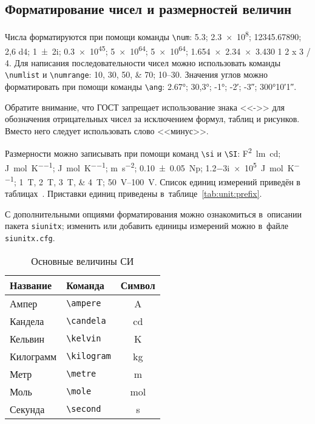 \subsection{Форматирование чисел и размерностей величин}\label{sec:units}

Числа форматируются при помощи команды \verb|\num|:
\num{5,3};
\num{2,3e8};
\num{12345,67890};
\num{2,6 d4};
\num{1+-2i};
\num{.3e45};
\num[exponent-base=2]{5 e64};
\num[exponent-base=2,exponent-to-prefix]{5 e64};
\num{1.654 x 2.34 x 3.430}
\num{1 2 x 3 / 4}.
Для написания последовательности чисел можно использовать команды \verb|\numlist| и \verb|\numrange|:
\numlist{10;30;50;70}; \numrange{10}{30}.
Значения углов можно форматировать при помощи команды \verb|\ang|:
\ang{2.67};
\ang{30,3};
\ang{-1;;};
\ang{;-2;};
\ang{;;-3};
\ang{300;10;1}.

Обратите внимание, что ГОСТ запрещает использование знака <<->> для обозначения отрицательных чисел
за исключением формул, таблиц и рисунков.
Вместо него следует использовать слово <<минус>>.

Размерности можно записывать при помощи команд \verb|\si| и \verb|\SI|:
\si{\farad\squared\lumen\candela};
\si{\joule\per\mole\per\kelvin};
\si[per-mode = symbol-or-fraction]{\joule\per\mole\per\kelvin};
\si{\metre\per\second\squared};
\SI{0.10(5)}{\neper};
\SI{1.2-3i e5}{\joule\per\mole\per\kelvin};
\SIlist{1;2;3;4}{\tesla};
\SIrange{50}{100}{\volt}.
Список единиц измерений приведён в таблицах~.
Приставки единиц приведены в~таблице~\ref{tab:unit:prefix}.

С дополнительными опциями форматирования можно ознакомиться в~описании пакета \texttt{siunitx};
изменить или добавить единицы измерений можно в~файле \texttt{siunitx.cfg}.

\begin{table}
    \centering
    \captionstyle{\centering}
    \caption{Основные величины СИ}\label{tab:unit:base}
    \begin{tabular}{llc}
        \toprule
        Название  & Команда                & Символ         \\
        \midrule
        Ампер     & \verb|\ampere| & \si{\ampere}   \\
        Кандела   & \verb|\candela| & \si{\candela}  \\
        Кельвин   & \verb|\kelvin| & \si{\kelvin}   \\
        Килограмм & \verb|\kilogram| & \si{\kilogram} \\
        Метр      & \verb|\metre| & \si{\metre}    \\
        Моль      & \verb|\mole| & \si{\mole}     \\
        Секунда   & \verb|\second| & \si{\second}   \\
        \bottomrule
    \end{tabular}
\end{table}

